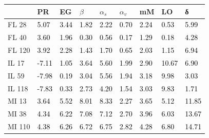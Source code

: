 \begin{tabular}{lllllllll}
\toprule
 & PR & EG & $β$ & $α_s$ & $α_v$ & mM & LO & δ \\
\midrule
FL 28 & \textcolor{black}{ 5.07 } & \textcolor{black}{ 3.44 } & \textcolor{black}{ 1.82 } & \textcolor{black}{ 2.22 } & \textcolor{black}{ 0.70 } & \textcolor{black}{ 2.24 } & \textcolor{black}{ 0.53 } & \textcolor{black}{ 5.99 } \\
FL 40 & \textcolor{black}{ 3.60 } & \textcolor{black}{ 1.96 } & \textcolor{black}{ 0.30 } & \textcolor{black}{ 0.56 } & \textcolor{black}{ 0.17 } & \textcolor{black}{ 1.29 } & \textcolor{black}{ 0.18 } & \textcolor{black}{ 4.28 } \\
FL 120 & \textcolor{black}{ 3.92 } & \textcolor{black}{ 2.28 } & \textcolor{black}{ 1.43 } & \textcolor{black}{ 1.70 } & \textcolor{black}{ 0.65 } & \textcolor{black}{ 2.03 } & \textcolor{black}{ 1.15 } & \textcolor{black}{ 6.94 } \\
IL 17 & \textcolor{black}{ -7.11 } & \textcolor{black}{ 1.05 } & \textcolor{black}{ 3.64 } & \textcolor{black}{ 5.60 } & \textcolor{black}{ 1.99 } & \textcolor{black}{ 2.90 } & \textcolor{black}{ 10.67 } & \textcolor{black}{ 6.90 } \\
IL 59 & \textcolor{black}{ -7.98 } & \textcolor{black}{ 0.19 } & \textcolor{black}{ 3.04 } & \textcolor{black}{ 5.56 } & \textcolor{black}{ 1.94 } & \textcolor{black}{ 3.18 } & \textcolor{black}{ 9.98 } & \textcolor{black}{ 3.03 } \\
IL 118 & \textcolor{black}{ -7.83 } & \textcolor{black}{ 0.33 } & \textcolor{black}{ 2.73 } & \textcolor{black}{ 4.20 } & \textcolor{black}{ 1.54 } & \textcolor{black}{ 3.03 } & \textcolor{black}{ 9.83 } & \textcolor{black}{ 1.71 } \\
MI 13 & \textcolor{black}{ 3.64 } & \textcolor{black}{ 5.52 } & \textcolor{black}{ 8.01 } & \textcolor{black}{ 8.33 } & \textcolor{black}{ 2.27 } & \textcolor{black}{ 3.65 } & \textcolor{black}{ 5.12 } & \textcolor{black}{ 11.85 } \\
MI 38 & \textcolor{black}{ 4.34 } & \textcolor{black}{ 6.22 } & \textcolor{black}{ 7.08 } & \textcolor{black}{ 7.12 } & \textcolor{black}{ 2.70 } & \textcolor{black}{ 3.96 } & \textcolor{black}{ 6.03 } & \textcolor{black}{ 13.67 } \\
MI 110 & \textcolor{black}{ 4.38 } & \textcolor{black}{ 6.26 } & \textcolor{black}{ 6.72 } & \textcolor{black}{ 6.75 } & \textcolor{black}{ 2.82 } & \textcolor{black}{ 4.28 } & \textcolor{black}{ 6.80 } & \textcolor{black}{ 14.71 } \\

\end{tabular}
